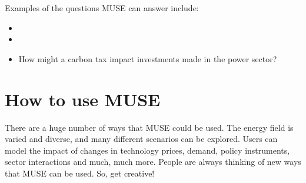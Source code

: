 \documentclass[letterpaper,10pt,english]{sphinxmanual}
\begin{document}
Examples of the questions MUSE can answer include:
\begin{itemize}
\item {} 

\item {} 

\item {} 
How might a carbon tax impact investments made in the power sector?

\end{itemize}


\section{How to use MUSE}
\label{\detokenize{overview:how-to-use-muse}}
There are a huge number of ways that MUSE could be used. The energy field is varied and diverse, and many different scenarios can be explored. Users can model the impact of changes in technology prices, demand, policy instruments, sector interactions and much, much more. People are always thinking of new ways that MUSE can be used. So, get creative!
\end{document}
